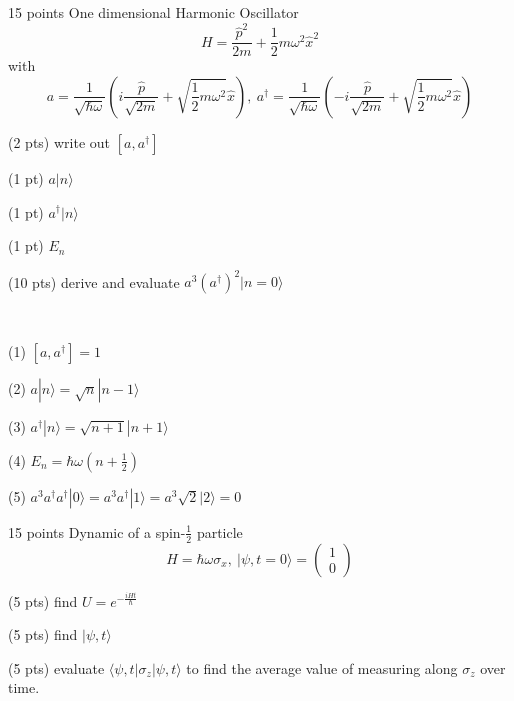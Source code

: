\documentclass[UTF8,12pt]{article} %
\makeatletter
\newenvironment{proof}[1][\protect\proofname]{\par
\normalfont\topsep6\p@\@plus6\p@\relax
\trivlist
\itemindent\parindent
\item[\hskip\labelsep
\scshape
#1]\ignorespaces
}{%
\endtrivlist\@endpefalse
}
\renewcommand{\proofname}{\it{Solution}}
\makeatother
\begin{document}
\begin{exercise}{15 points}{}
One dimensional Harmonic Oscillator
$$H = \frac{\hat{p}^{2}}{2m} + \frac{1}{2}m\omega^{2}\hat{x}^{2}$$
with
$$a = \frac{1}{\sqrt{\hbar\omega}}\left(i\frac{\hat{p}}{\sqrt{2m}} + \sqrt{\frac{1}{2}m\omega^{2}}\hat{x}\right),~ a^{\dag} = \frac{1}{\sqrt{\hbar\omega}}\left(-i\frac{\hat{p}}{\sqrt{2m}} + \sqrt{\frac{1}{2}m\omega^{2}}\hat{x}\right)$$
\begin{enumerate*}
\item (2 pts) write out $[a,a^{\dag}]$
\item (1 pt) $a|n\rangle$
\item (1 pt) $a^{\dag}|n\rangle$
\item (1 pt) $E_{n}$
\item (10 pts) derive and evaluate $a^{3}(a^{\dag})^{2}|n=0\rangle$
\end{enumerate*}
\end{exercise}

\begin{proof}[Solution]~\par
(1) $[a,a^{\dag}] = 1$\par
(2) $a|n\rangle = \sqrt{n}|n-1\rangle$\par
(3) $a^{\dag}|n\rangle = \sqrt{n+1}|n+1\rangle$\par
(4) $E_{n} = \hbar\omega(n + \frac{1}{2})$\par
(5) $a^{3}a^{\dag}a^{\dag}|0\rangle = a^{3}a^{\dag}|1\rangle = a^{3}\sqrt{2}|2\rangle = 0$
\end{proof}

\begin{exercise}{15 points}{}
Dynamic of a spin-$\frac{1}{2}$ particle
$$H = \hbar\omega\sigma_{x},~ |\psi,t=0\rangle = \begin{pmatrix}1\\0\end{pmatrix}$$
\begin{enumerate*}
\item (5 pts) find $U = e^{-\frac{iHt}{\hbar}}$
\item (5 pts) find $|\psi,t\rangle$
\item (5 pts) evaluate $\langle\psi,t|\sigma_{z}|\psi,t\rangle$ to find the average value of measuring along $\sigma_{z}$ over time.
\end{enumerate*}
\end{exercise}
\end{document}
